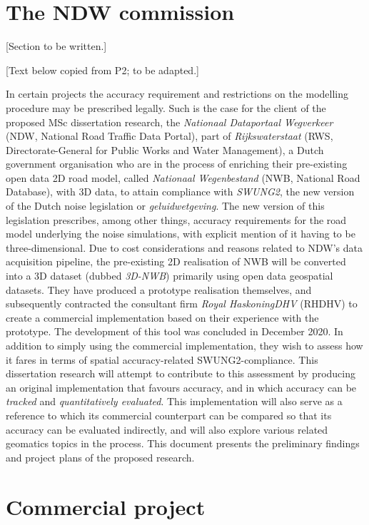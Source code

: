 \section{The NDW commission}
\label{sec:commission}

[Section to be written.]

[Text below copied from P2; to be adapted.]

In certain projects the accuracy requirement and restrictions on the modelling procedure may be prescribed legally. Such is the case for the client of the proposed MSc dissertation research, the \textit{Nationaal Dataportaal Wegverkeer} (NDW, National Road Traffic Data Portal), part of \textit{Rijkswaterstaat} (RWS, Directorate-General for Public Works and Water Management), a Dutch government organisation who are in the process of enriching their pre-existing open data 2D road model, called \textit{Nationaal Wegenbestand} (NWB, National Road Database), with 3D data, to attain compliance with \textit{SWUNG2}, the new version of the Dutch noise legislation or \textit{geluidwetgeving}. The new version of this legislation prescribes, among other things, accuracy requirements for the road model underlying the noise simulations, with explicit mention of it having to be three-dimensional. Due to cost considerations and reasons related to NDW’s data acquisition pipeline, the pre-existing 2D realisation of NWB will be converted into a 3D dataset (dubbed \textit{3D-NWB}) primarily using open data geospatial datasets. They have produced a prototype realisation themselves, and subsequently contracted the consultant firm \textit{Royal HaskoningDHV} (RHDHV) to create a commercial implementation based on their experience with the prototype. The development of this tool was concluded in December 2020. In addition to simply using the commercial implementation, they wish to assess how it fares in terms of spatial accuracy-related SWUNG2-compliance. This dissertation research will attempt to contribute to this assessment by producing an original implementation that favours accuracy, and in which accuracy can be \textit{tracked} and \textit{quantitatively evaluated}. This implementation will also serve as a reference to which its commercial counterpart can be compared so that its accuracy can be evaluated indirectly, and will also explore various related geomatics topics in the process. This document presents the preliminary findings and project plans of the proposed research.

\section{Commercial project}
\label{sec:commercial}

